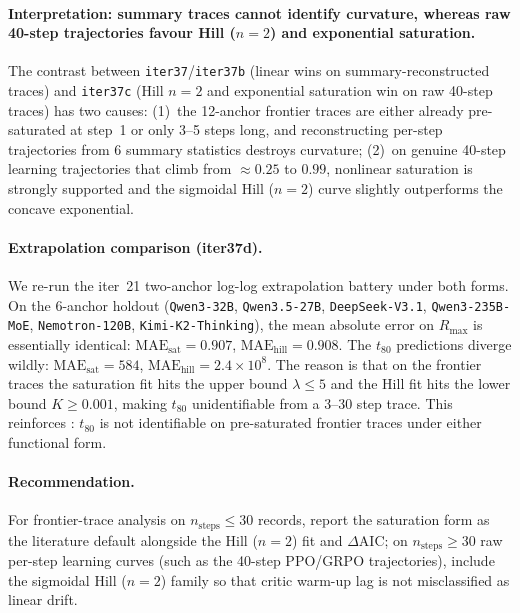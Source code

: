 \paragraph{Interpretation: summary traces cannot identify curvature, whereas raw 40-step trajectories favour Hill ($n=2$) and exponential saturation.}
The contrast between \texttt{iter37}/\texttt{iter37b} (linear wins on
summary-reconstructed traces) and \texttt{iter37c} (Hill $n=2$ and
exponential saturation win on raw 40-step traces) has two causes:
(1)~the 12-anchor frontier traces are either already pre-saturated at
step~1 or only 3--5 steps long, and reconstructing per-step trajectories
from 6 summary statistics destroys curvature; (2)~on genuine 40-step
learning trajectories that climb from $\approx 0.25$ to $0.99$,
nonlinear saturation is strongly supported and the sigmoidal Hill
($n=2$) curve slightly outperforms the concave exponential.

\paragraph{Extrapolation comparison (iter37d).}
We re-run the iter~21 two-anchor log-log extrapolation battery under
both forms. On the 6-anchor holdout (\texttt{Qwen3-32B},
\texttt{Qwen3.5-27B}, \texttt{DeepSeek-V3.1}, \texttt{Qwen3-235B-MoE},
\texttt{Nemotron-120B}, \texttt{Kimi-K2-Thinking}),
the mean absolute error on $R_{\max}$ is essentially identical:
$\mathrm{MAE}_{\mathrm{sat}}=0.907$, $\mathrm{MAE}_{\mathrm{hill}}=0.908$.
The $t_{80}$ predictions diverge wildly: $\mathrm{MAE}_{\mathrm{sat}}=584$,
$\mathrm{MAE}_{\mathrm{hill}}=2.4 \times 10^{8}$. The reason is that
on the frontier traces the saturation fit hits the upper
bound $\lambda \le 5$ and the Hill fit hits the lower bound $K \ge
0.001$, making $t_{80}$ unidentifiable from a 3--30 step trace.
This reinforces : $t_{80}$ is not
identifiable on pre-saturated frontier traces under either functional
form.

\paragraph{Recommendation.}
For frontier-trace analysis on $n_{\mathrm{steps}} \le 30$ records,
report the saturation form as the literature default alongside the
Hill ($n=2$) fit and $\Delta\mathrm{AIC}$; on $n_{\mathrm{steps}} \ge 30$
raw per-step learning curves (such as the 40-step PPO/GRPO trajectories),
include the sigmoidal Hill ($n=2$) family so that critic warm-up lag is
not misclassified as linear drift.

